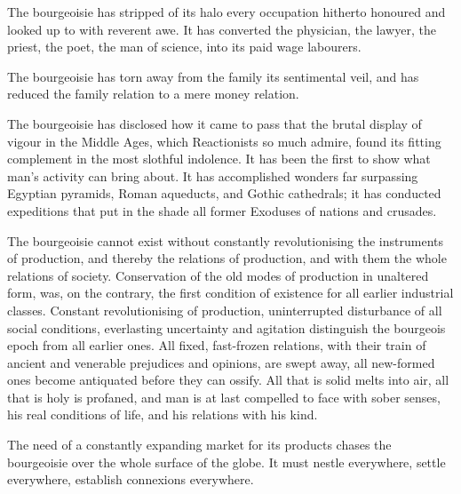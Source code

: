 The bourgeoisie has stripped of its halo every occupation hitherto
honoured and looked up to with reverent awe. It has converted the
physician, the lawyer, the priest, the poet, the man of science, into
its paid wage labourers.

The bourgeoisie has torn away from the family its sentimental veil, and
has reduced the family relation to a mere money relation.

The bourgeoisie has disclosed how it came to pass that the brutal
display of vigour in the Middle Ages, which Reactionists so much
admire, found its fitting complement in the most slothful indolence. It
has been the first to show what man’s activity can bring about. It has
accomplished wonders far surpassing Egyptian pyramids, Roman aqueducts,
and Gothic cathedrals; it has conducted expeditions that put in the
shade all former Exoduses of nations and crusades.

The bourgeoisie cannot exist without constantly revolutionising the
instruments of production, and thereby the relations of production, and
with them the whole relations of society. Conservation of the old modes
of production in unaltered form, was, on the contrary, the first
condition of existence for all earlier industrial classes. Constant
revolutionising of production, uninterrupted disturbance of all social
conditions, everlasting uncertainty and agitation distinguish the
bourgeois epoch from all earlier ones. All fixed, fast-frozen
relations, with their train of ancient and venerable prejudices and
opinions, are swept away, all new-formed ones become antiquated before
they can ossify. All that is solid melts into air, all that is holy is
profaned, and man is at last compelled to face with sober senses, his
real conditions of life, and his relations with his kind.

The need of a constantly expanding market for its products chases the
bourgeoisie over the whole surface of the globe. It must nestle
everywhere, settle everywhere, establish connexions everywhere.

